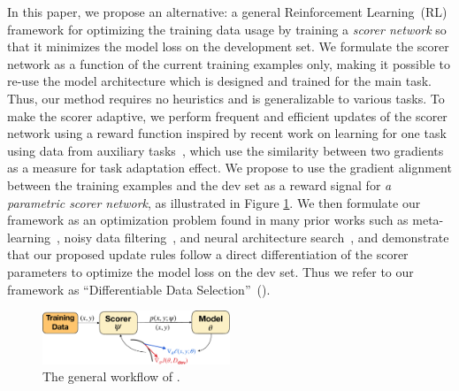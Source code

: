 In this paper, we propose an alternative: a general Reinforcement Learning~(RL) framework for optimizing the training data usage by training a \emph{scorer network} so that it minimizes the model loss on the development set.
We formulate the scorer network as a function of the current training examples only,
making it possible to re-use the model architecture which is designed and trained for the main task. Thus, our method requires no heuristics and is generalizable to various tasks. To make the scorer adaptive, we perform frequent and efficient updates of the scorer network using a reward function inspired by recent work on learning for one task using data from auxiliary tasks~\citep{cos_sim,meta_aux_learn}, which use the similarity between two gradients as a measure for task adaptation effect.
We propose to use the gradient alignment between the training examples and the dev set as a reward signal for \emph{a parametric scorer network}, as illustrated in Figure \ref{fig:method}. We then formulate our framework as an optimization problem found in many prior works such as meta-learning~\citep{finn2017model}, noisy data filtering~\citep{learn_reweight}, and neural architecture search~\citep{darts}, and demonstrate that our proposed update rules follow a direct differentiation of the scorer parameters to optimize the model loss on the dev set.
Thus we refer to our framework as ``Differentiable Data Selection''~(\dds).

\begin{figure}
\begin{center}
    \centering
    \vspace{-0.5cm}
    \includegraphics[width=0.5\textwidth]{figs/method_plot_crop.pdf}
    \caption{The general workflow of \dds.}
    \label{fig:method}
    \vspace{-0.5cm}
\end{center}
\end{figure}

